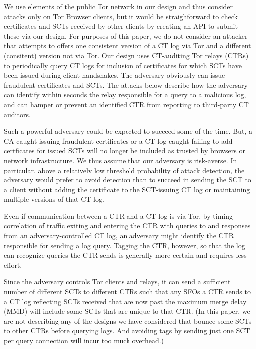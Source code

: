 We use elements of the public Tor network in our design and thus
consider attacks only on Tor Browser clients, but it would be
straighforward to check certificates and SCTs received by other
clients by creating an API to submit these via our design. For
purposes of this paper, we do not consider an attacker that attempts
to offers one consistent version of a CT log via Tor and a different
(consitent) version not via Tor.  Our design uses CT-auditing Tor
relays (CTRs) to periodically query CT logs for inclusion of
certificates for which SCTs have been issued during client
handshakes. The adversary obviously can issue fraudulent certificates
and SCTs. The attacks below describe how the adversary can identify
within seconds the relay responsible for a query to a malicious log,
and can hamper or prevent an identified CTR from reporting to
third-party CT auditors.

Such a powerful adversary could be expected to succeed some of the
time.  But, a CA caught issuing fraudulent certificates or a CT log
caught failing to add certficates for issued SCTs will no longer be
included as trusted by browsers or network infrastructure. We thus
assume that our adversary is risk-averse.  In particular, above a
relatively low threshold probability of attack detection, the
adversary would prefer to avoid detection than to succeed in sending
the SCT to a client without adding the certificate to the SCT-issuing CT log
or maintaining multiple versions of that CT log.


Even if communication between a CTR and a CT log is
via Tor, by timing correlation of traffic exiting and entering the CTR
with queries to and responses from an adversary-controlled CT log, an
adversary might identify the CTR responsible for sending a log
query. Tagging the CTR, however, so that the log can recognize queries
the CTR sends is generally more certain and requires less effort.

 Since the adversary controls Tor clients and
relays, it can send a sufficient number of different SCTs to different
CTRs such that any SFOs a CTR sends to a CT log reflecting SCTs
received that are now past the maximum merge delay (MMD) will include
some SCTs that are unique to that CTR\@. (In this paper, we are not
describing any of the designs we have considered that bounce some SCTs to
other CTRs before querying logs. And avoiding tags by sending just one
SCT per query connection will incur too much overhead.)

